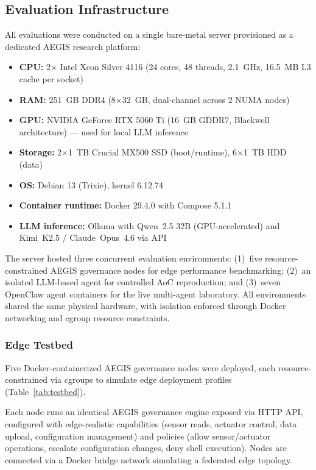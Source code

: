 \documentclass[journal]{IEEEtran}
\begin{document}
\subsection{Evaluation Infrastructure}

All evaluations were conducted on a single bare-metal server provisioned as a dedicated AEGIS research platform:

\begin{itemize}
\item \textbf{CPU:} 2$\times$ Intel Xeon Silver 4116 (24 cores, 48 threads, 2.1~GHz, 16.5~MB L3 cache per socket)
\item \textbf{RAM:} 251~GB DDR4 (8$\times$32~GB, dual-channel across 2 NUMA nodes)
\item \textbf{GPU:} NVIDIA GeForce RTX 5060 Ti (16~GB GDDR7, Blackwell architecture) --- used for local LLM inference
\item \textbf{Storage:} 2$\times$1~TB Crucial MX500 SSD (boot/runtime), 6$\times$1~TB HDD (data)
\item \textbf{OS:} Debian 13 (Trixie), kernel 6.12.74
\item \textbf{Container runtime:} Docker 29.4.0 with Compose 5.1.1
\item \textbf{LLM inference:} Ollama with Qwen~2.5 32B (GPU-accelerated) and Kimi~K2.5 / Claude~Opus~4.6 via API
\end{itemize}

The server hosted three concurrent evaluation environments: (1)~five resource-constrained AEGIS governance nodes for edge performance benchmarking; (2)~an isolated LLM-based agent for controlled AoC reproduction; and (3)~seven OpenClaw agent containers for the live multi-agent laboratory. All environments shared the same physical hardware, with isolation enforced through Docker networking and cgroup resource constraints.

\subsubsection{Edge Testbed}

Five Docker-containerized AEGIS governance nodes were deployed, each resource-constrained via cgroups to simulate edge deployment profiles (Table~\ref{tab:testbed}).

Each node runs an identical AEGIS governance engine exposed via HTTP API, configured with edge-realistic capabilities (sensor reads, actuator control, data upload, configuration management) and policies (allow sensor/actuator operations, escalate configuration changes, deny shell execution). Nodes are connected via a Docker bridge network simulating a federated edge topology.
\end{document}
